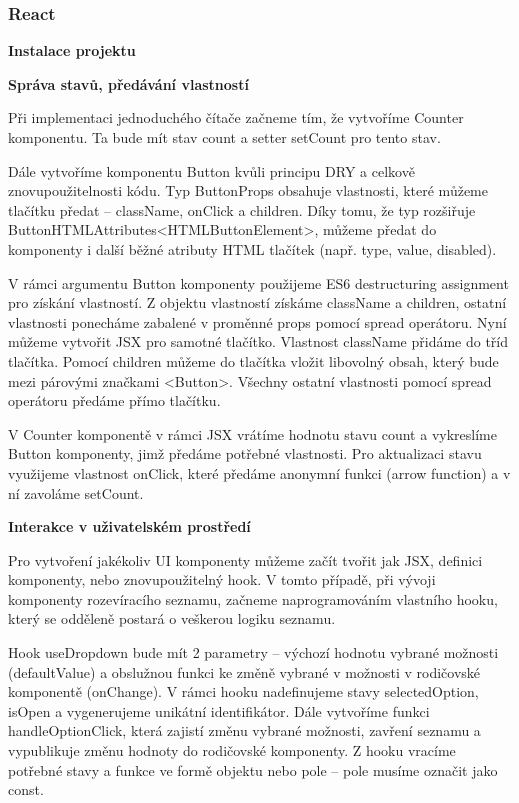 \subsubsection{React}

\begin{flushleft}
  \textbf{Instalace projektu}
\end{flushleft}

\begin{flushleft}
  \textbf{Správa stavů, předávání vlastností}
\end{flushleft}

Při implementaci jednoduchého čítače začneme tím, že vytvoříme Counter komponentu. Ta bude mít stav count a setter setCount pro tento stav.

Dále vytvoříme komponentu Button kvůli principu DRY a celkově znovupoužitelnosti kódu. 
Typ ButtonProps obsahuje vlastnosti, které můžeme tlačítku předat -- className, onClick a children. 
Díky tomu, že typ rozšiřuje ButtonHTMLAttributes<HTMLButtonElement>, můžeme předat do komponenty i další běžné atributy HTML tlačítek (např. type, value, disabled).

V rámci argumentu Button komponenty použijeme ES6 destructuring assignment pro získání vlastností. 
Z objektu vlastností získáme className a children, ostatní vlastnosti ponecháme zabalené v proměnné props pomocí spread operátoru. 
Nyní můžeme vytvořit JSX pro samotné tlačítko. Vlastnost className přidáme do tříd tlačítka. 
Pomocí children můžeme do tlačítka vložit libovolný obsah, který bude mezi párovými značkami <Button>. 
Všechny ostatní vlastnosti pomocí spread operátoru předáme přímo tlačítku.

V Counter komponentě v rámci JSX vrátíme hodnotu stavu count a vykreslíme Button komponenty, jimž předáme potřebné vlastnosti. 
Pro aktualizaci stavu využijeme vlastnost onClick, které předáme anonymní funkci (arrow function) a v ní zavoláme setCount.

\begin{flushleft}
  \textbf{Interakce v uživatelském prostředí}
\end{flushleft}

Pro vytvoření jakékoliv UI komponenty můžeme začít tvořit jak JSX, definici komponenty, nebo znovupoužitelný hook. 
V tomto případě, při vývoji komponenty rozevíracího seznamu, začneme naprogramováním vlastního hooku, který se odděleně postará o veškerou logiku seznamu.

Hook useDropdown bude mít 2 parametry -- výchozí hodnotu vybrané možnosti (defaultValue) a obslužnou funkci ke změně vybrané v možnosti v rodičovské komponentě (onChange). 
V rámci hooku nadefinujeme stavy selectedOption, isOpen a vygenerujeme unikátní identifikátor. 
Dále vytvoříme funkci handleOptionClick, která zajistí změnu vybrané možnosti, zavření seznamu a vypublikuje změnu hodnoty do rodičovské komponenty. 
Z hooku vracíme potřebné stavy a funkce ve formě objektu nebo pole -- pole musíme označit jako const.

